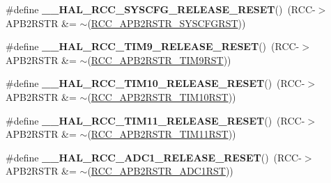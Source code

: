 \begin{DoxyCompactItemize}
\item 
\hypertarget{group___r_c_c___a_p_b2___force___release___reset_ga56de80d50f5ab276ebdeee16a0e2a31b}{\#define {\bfseries \-\_\-\-\_\-\-H\-A\-L\-\_\-\-R\-C\-C\-\_\-\-S\-Y\-S\-C\-F\-G\-\_\-\-R\-E\-L\-E\-A\-S\-E\-\_\-\-R\-E\-S\-E\-T}()~(R\-C\-C-\/$>$A\-P\-B2\-R\-S\-T\-R \&= $\sim$(\hyperlink{group___peripheral___registers___bits___definition_ga813d42b8d48ae6379c053a44870af49d}{R\-C\-C\-\_\-\-A\-P\-B2\-R\-S\-T\-R\-\_\-\-S\-Y\-S\-C\-F\-G\-R\-S\-T}))}\label{group___r_c_c___a_p_b2___force___release___reset_ga56de80d50f5ab276ebdeee16a0e2a31b}

\item 
\hypertarget{group___r_c_c___a_p_b2___force___release___reset_ga71fee37e3aff2c5040e2e9f4e153f4ff}{\#define {\bfseries \-\_\-\-\_\-\-H\-A\-L\-\_\-\-R\-C\-C\-\_\-\-T\-I\-M9\-\_\-\-R\-E\-L\-E\-A\-S\-E\-\_\-\-R\-E\-S\-E\-T}()~(R\-C\-C-\/$>$A\-P\-B2\-R\-S\-T\-R \&= $\sim$(\hyperlink{group___peripheral___registers___bits___definition_gab3aa588d4814a289d939e111492724af}{R\-C\-C\-\_\-\-A\-P\-B2\-R\-S\-T\-R\-\_\-\-T\-I\-M9\-R\-S\-T}))}\label{group___r_c_c___a_p_b2___force___release___reset_ga71fee37e3aff2c5040e2e9f4e153f4ff}

\item 
\hypertarget{group___r_c_c___a_p_b2___force___release___reset_ga704b80ff2f733e161d30e4138f90614d}{\#define {\bfseries \-\_\-\-\_\-\-H\-A\-L\-\_\-\-R\-C\-C\-\_\-\-T\-I\-M10\-\_\-\-R\-E\-L\-E\-A\-S\-E\-\_\-\-R\-E\-S\-E\-T}()~(R\-C\-C-\/$>$A\-P\-B2\-R\-S\-T\-R \&= $\sim$(\hyperlink{group___peripheral___registers___bits___definition_gac76155acdc99c8c6502ba3beba818f42}{R\-C\-C\-\_\-\-A\-P\-B2\-R\-S\-T\-R\-\_\-\-T\-I\-M10\-R\-S\-T}))}\label{group___r_c_c___a_p_b2___force___release___reset_ga704b80ff2f733e161d30e4138f90614d}

\item 
\hypertarget{group___r_c_c___a_p_b2___force___release___reset_gab66378d2b26c2c47522f268e129b6709}{\#define {\bfseries \-\_\-\-\_\-\-H\-A\-L\-\_\-\-R\-C\-C\-\_\-\-T\-I\-M11\-\_\-\-R\-E\-L\-E\-A\-S\-E\-\_\-\-R\-E\-S\-E\-T}()~(R\-C\-C-\/$>$A\-P\-B2\-R\-S\-T\-R \&= $\sim$(\hyperlink{group___peripheral___registers___bits___definition_ga9651c8201d42ba03bb1bf89d9d39e60c}{R\-C\-C\-\_\-\-A\-P\-B2\-R\-S\-T\-R\-\_\-\-T\-I\-M11\-R\-S\-T}))}\label{group___r_c_c___a_p_b2___force___release___reset_gab66378d2b26c2c47522f268e129b6709}

\item 
\hypertarget{group___r_c_c___a_p_b2___force___release___reset_ga681299b233339aa39a30fa5589cac5bc}{\#define {\bfseries \-\_\-\-\_\-\-H\-A\-L\-\_\-\-R\-C\-C\-\_\-\-A\-D\-C1\-\_\-\-R\-E\-L\-E\-A\-S\-E\-\_\-\-R\-E\-S\-E\-T}()~(R\-C\-C-\/$>$A\-P\-B2\-R\-S\-T\-R \&= $\sim$(\hyperlink{group___peripheral___registers___bits___definition_ga7b818d0d9747621c936ad16c93a4956a}{R\-C\-C\-\_\-\-A\-P\-B2\-R\-S\-T\-R\-\_\-\-A\-D\-C1\-R\-S\-T}))}\label{group___r_c_c___a_p_b2___force___release___reset_ga681299b233339aa39a30fa5589cac5bc}


\end{DoxyCompactItemize}
